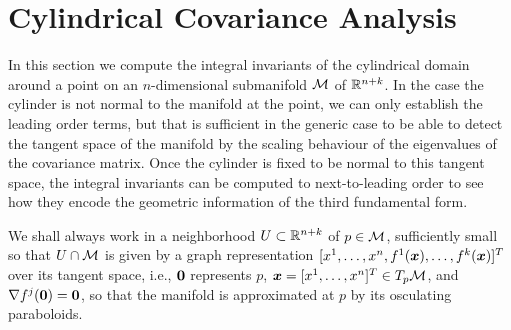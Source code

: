 \documentclass[letterpaper, reqno, 11pt]{amsart}
\theoremstyle{definition}
\theoremstyle{remark}
\numberwithin{equation}{section}
\begin{document}
\section{Cylindrical Covariance Analysis}\label{sec:cylCov}

In this section we compute the integral invariants of the cylindrical domain around a point on an $n$-dimensional submanifold ${\mathcal M}$ of ${\mathbb R}^{n+k}$. In the case the cylinder is not normal to the manifold at the point, we can only establish the leading order terms, but that is sufficient in the generic case to be able to detect the tangent space of the manifold by the scaling behaviour of the eigenvalues of the covariance matrix. Once the cylinder is fixed to be normal to this tangent space, the integral invariants can be computed to next-to-leading order to see how they encode the geometric information of the third fundamental form.

We shall always work in a neighborhood $U\subset{\mathbb R}^{n+k}$ of $p\in{\mathcal M}$, sufficiently small so that $U\cap{\mathcal M}$ is given by a graph representation $[x^1,\dots,x^n, f^1(\boldsymbol{x}),\dots,f^k(\boldsymbol{x})]^T$ over its tangent space, i.e., $\boldsymbol{0}$ represents $p$, $\boldsymbol{x}=[x^1,\dots,x^n]^T\in T_p{\mathcal M}$, and $\nabla f^j(\boldsymbol{0})=\boldsymbol{0}$, so that the manifold is approximated at $p$ by its osculating paraboloids.
\end{document}
